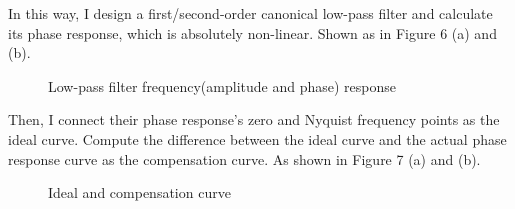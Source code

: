\documentclass[a4paper]{tufte-handout} %
\begin{document}
In this way, I design a first/second-order canonical low-pass filter and calculate its phase response, which is absolutely non-linear. Shown as in Figure 6 (a) and (b).
\begin{figure}[h!]
    \caption{Low-pass filter frequency(amplitude and phase) response}
\end{figure}
Then, I connect their phase response's zero and Nyquist frequency points as the ideal curve. Compute the difference between the ideal curve and the actual phase response curve as the compensation curve. As shown in Figure 7 (a) and (b).
\begin{figure}[h!]
    \caption{Ideal and compensation curve}
\end{figure}
\end{document}
